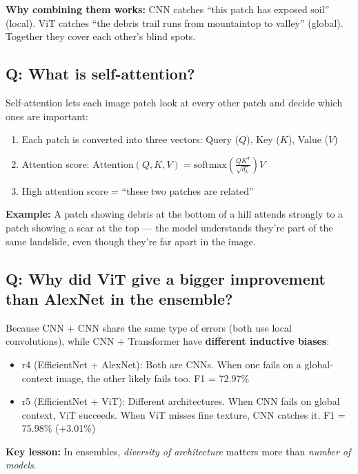 \documentclass[11pt]{article}
\begin{document}
\textbf{Why combining them works:} CNN catches ``this patch has exposed soil'' (local). ViT catches ``the debris trail runs from mountaintop to valley'' (global). Together they cover each other's blind spots.

\subsection{Q: What is self-attention?}

Self-attention lets each image patch look at every other patch and decide which ones are important:

\begin{enumerate}[noitemsep]
    \item Each patch is converted into three vectors: Query ($Q$), Key ($K$), Value ($V$)
    \item Attention score: $\text{Attention}(Q, K, V) = \text{softmax}\left(\frac{QK^T}{\sqrt{d_k}}\right) V$
    \item High attention score = ``these two patches are related''
\end{enumerate}

\textbf{Example:} A patch showing debris at the bottom of a hill attends strongly to a patch showing a scar at the top --- the model understands they're part of the same landslide, even though they're far apart in the image.

\subsection{Q: Why did ViT give a bigger improvement than AlexNet in the ensemble?}

Because CNN + CNN share the same type of errors (both use local convolutions), while CNN + Transformer have \textbf{different inductive biases}:

\begin{itemize}[noitemsep]
    \item r4 (EfficientNet + AlexNet): Both are CNNs. When one fails on a global-context image, the other likely fails too. F1 = 72.97\%
    \item r5 (EfficientNet + ViT): Different architectures. When CNN fails on global context, ViT succeeds. When ViT misses fine texture, CNN catches it. F1 = 75.98\% (+3.01\%)
\end{itemize}

\textbf{Key lesson:} In ensembles, \textit{diversity of architecture} matters more than \textit{number of models}.
\end{document}

